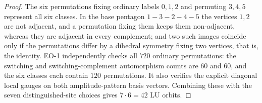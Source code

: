 \begin{proof}
The six permutations fixing ordinary labels $0,1,2$ and permuting
$3,4,5$ represent all six classes. In the base pentagon
$1\!-\!3\!-\!2\!-\!4\!-\!5$ the vertices $1,2$ are not adjacent, and a
permutation fixing them keeps them non-adjacent, whereas they are adjacent
in every complement; and two such images coincide only if the permutations
differ by a dihedral symmetry fixing two vertices, that is, the identity.
EO-1 independently checks all $720$ ordinary permutations: the switching
and switching-complement automorphism counts are $60$ and $60$, and
the six classes each contain $120$ permutations. It also verifies the
explicit diagonal local gauges on both amplitude-pattern basis vectors. Combining these with the seven
distinguished-site choices gives $7\cdot6=42$ LU orbits.
\end{proof}
